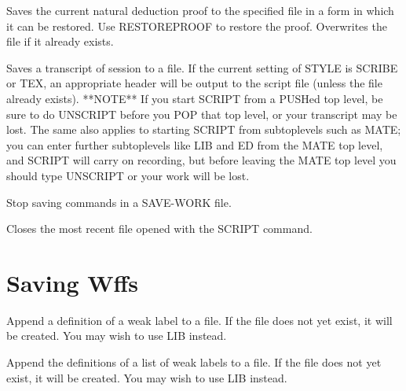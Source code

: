 \begin{description}
\item[\parbox{\textwidth}{SAVEPROOF \textit{savefile}}]  
Saves the current natural deduction proof to the specified file in
a form in which it can be restored.  Use RESTOREPROOF to restore the proof.
Overwrites the file if it already exists.

\item[\parbox{\textwidth}{SCRIPT \textit{scriptfile} \textit{if-exists-append}}]  
Saves a transcript of session to a file. If the current setting
of STYLE is SCRIBE or TEX, an appropriate header will be output to the 
script file (unless the file already exists).
**NOTE** If you start SCRIPT from a PUSHed top level, be sure to do 
UNSCRIPT before you POP that top level, or your transcript may be lost.
The same also applies to starting SCRIPT from subtoplevels such as MATE;
you can enter further subtoplevels like LIB and ED from the MATE top level,
and SCRIPT will carry on recording, but before leaving the MATE top level 
you should type UNSCRIPT or your work will be lost.

\item[\parbox{\textwidth}{STOP-SAVE}]  
Stop saving commands in a SAVE-WORK file.

\item[\parbox{\textwidth}{UNSCRIPT}]  
Closes the most recent file opened with the SCRIPT command.
\item
\end{description}

\section{Saving Wffs}

\begin{description} 
\item[\parbox{\textwidth}{APPEND-WFF \textit{weak-label} \textit{help-string} \textit{filename}}]  
Append a definition of a weak label to a file.  If the file does
not yet exist, it will be created. You may wish to use LIB instead.

\item[\parbox{\textwidth}{APPEND-WFFS \textit{weak-labels} \textit{filename}}]  
Append the definitions of a list of weak labels to a file.
If the file does not yet exist, it will be created. You may wish to use LIB
    instead.
\item
\end{description}

